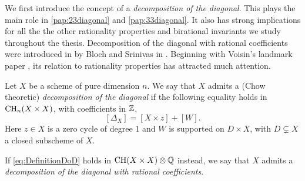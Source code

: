 We first introduce the concept of a \emph{decomposition of the diagonal}. This plays the main role in \cref{pap:23diagonal} and \cref{pap:33diagonal}. It also has strong implications for all the the other rationality properties and birational invariants we study throughout the thesis. Decomposition of the diagonal with rational coefficients were introduced in by Bloch and Srinivas in \cite{BSCorrespondences}. Beginning with Voisin's landmark paper \cite{VoisinDoubleQuartic}, its relation to rationality properties has attracted much attention.
\begin{definition}
	\label{def:DoD}
	Let $X$ be a scheme of pure dimension $n$. We say that $X$ admits a (Chow theoretic) \emph{decomposition of the diagonal} if the following equality holds in $\operatorname{CH}_n(X \times X)$, with coefficients in $\mathbb{Z}$,
	\begin{equation}
		\label{eq:DefinitionDoD}
		[\Delta_X] = [X \times z] + [W].
	\end{equation}
	Here $z \in X$ is a zero cycle of degree 1 and $W$ is supported on $D \times X$, with $D \subsetneq X$ a closed subscheme of $X$.
\end{definition}
If \eqref{eq:DefinitionDoD} holds in $\operatorname{CH}(X \times X) \otimes \mathbb{Q}$ instead, we say that $X$ admits a \emph{decomposition of the diagonal with rational coefficients}.


